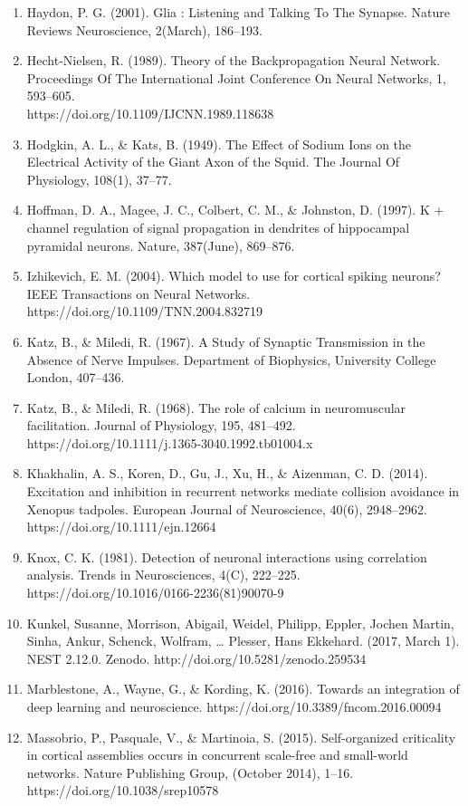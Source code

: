 \documentclass[11pt]{article}
\begin{document}
\begin{enumerate}
\item Haydon, P. G. (2001). Glia : Listening and Talking To The Synapse. Nature Reviews Neuroscience, 2(March), 186–193.
\item Hecht-Nielsen, R. (1989). Theory of the Backpropagation Neural Network. Proceedings Of The International Joint Conference On Neural Networks, 1, 593–605.\\https://doi.org/10.1109/IJCNN.1989.118638
\item Hodgkin, A. L., \& Kats, B. (1949). The Effect of Sodium Ions on the Electrical Activity of the Giant Axon of the Squid. The Journal Of Physiology, 108(1), 37–77.
\item Hoffman, D. A., Magee, J. C., Colbert, C. M., \& Johnston, D. (1997). K + channel regulation of signal propagation in dendrites of hippocampal pyramidal neurons. Nature, 387(June), 869–876.
\item Izhikevich, E. M. (2004). Which model to use for cortical spiking neurons? IEEE Transactions on Neural Networks. https://doi.org/10.1109/TNN.2004.832719
\item Katz, B., \& Miledi, R. (1967). A Study of Synaptic Transmission in the Absence of Nerve Impulses. Department of Biophysics, University College London, 407–436.
\item Katz, B., \& Miledi, R. (1968). The role of calcium in neuromuscular facilitation. Journal of Physiology, 195, 481–492. https://doi.org/10.1111/j.1365-3040.1992.tb01004.x
\item Khakhalin, A. S., Koren, D., Gu, J., Xu, H., \& Aizenman, C. D. (2014). Excitation and inhibition in recurrent networks mediate collision avoidance in Xenopus tadpoles. European Journal of Neuroscience, 40(6), 2948–2962. https://doi.org/10.1111/ejn.12664
\item Knox, C. K. (1981). Detection of neuronal interactions using correlation analysis. Trends in Neurosciences, 4(C), 222–225. https://doi.org/10.1016/0166-2236(81)90070-9
\item Kunkel, Susanne, Morrison, Abigail, Weidel, Philipp, Eppler, Jochen Martin, Sinha, Ankur, Schenck, Wolfram, … Plesser, Hans Ekkehard. (2017, March 1). NEST 2.12.0. Zenodo. http://doi.org/10.5281/zenodo.259534
\item Marblestone, A., Wayne, G., \& Kording, K. (2016). Towards an integration of deep learning and neuroscience. https://doi.org/10.3389/fncom.2016.00094
\item Massobrio, P., Pasquale, V., \& Martinoia, S. (2015). Self-organized criticality in cortical assemblies occurs in concurrent scale-free and small-world networks. Nature Publishing Group, (October 2014), 1–16. https://doi.org/10.1038/srep10578

\end{enumerate}
\end{document}
